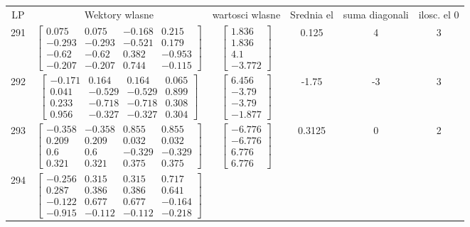 \documentclass[a4paper,12pt]{article}
\begin{document}
\bgroup {} \vspace{0.2in} \begin{tabular}{c c c c c c}
LP &Wektory wlasne & wartosci wlasne & Srednia el & suma diagonali & ilosc. el 0\\
291
&
$\begin{bmatrix} 0.075 & 0.075 & -0.168 & 0.215 \\ -0.293 & -0.293 & -0.521 & 0.179 \\ -0.62 & -0.62 & 0.382 & -0.953 \\ -0.207 & -0.207 & 0.744 & -0.115 \end{bmatrix}$
&
$\begin{bmatrix} 1.836 \\ 1.836 \\ 4.1 \\ -3.772 \end{bmatrix}$
&
0.125
&
4
&
3
\\
292
&
$\begin{bmatrix} -0.171 & 0.164 & 0.164 & 0.065 \\ 0.041 & -0.529 & -0.529 & 0.899 \\ 0.233 & -0.718 & -0.718 & 0.308 \\ 0.956 & -0.327 & -0.327 & 0.304 \end{bmatrix}$
&
$\begin{bmatrix} 6.456 \\ -3.79 \\ -3.79 \\ -1.877 \end{bmatrix}$
&
-1.75
&
-3
&
3
\\
293
&
$\begin{bmatrix} -0.358 & -0.358 & 0.855 & 0.855 \\ 0.209 & 0.209 & 0.032 & 0.032 \\ 0.6 & 0.6 & -0.329 & -0.329 \\ 0.321 & 0.321 & 0.375 & 0.375 \end{bmatrix}$
&
$\begin{bmatrix} -6.776 \\ -6.776 \\ 6.776 \\ 6.776 \end{bmatrix}$
&
0.3125
&
0
&
2
\\
294
&
$\begin{bmatrix} -0.256 & 0.315 & 0.315 & 0.717 \\ 0.287 & 0.386 & 0.386 & 0.641 \\ -0.122 & 0.677 & 0.677 & -0.164 \\ -0.915 & -0.112 & -0.112 & -0.218 \end{bmatrix}$

\end{tabular}
\end{document}
